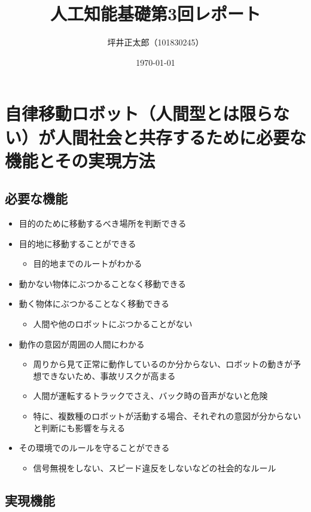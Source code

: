 \documentclass[a4paper,10pt]{jsarticle}
\begin{document}
\title{人工知能基礎第3回レポート}
\author{坪井正太郎（101830245）}
\date{\today}
\maketitle
\section{自律移動ロボット（人間型とは限らない）が人間社会と共存するために必要な機能とその実現方法}
\subsection{必要な機能}
\begin{itemize}
  \item 目的のために移動するべき場所を判断できる
  \item 目的地に移動することができる
        \begin{itemize}
          \item 目的地までのルートがわかる
        \end{itemize}
  \item 動かない物体にぶつかることなく移動できる
  \item 動く物体にぶつかることなく移動できる
        \begin{itemize}
          \item 人間や他のロボットにぶつかることがない
        \end{itemize}
  \item 動作の意図が周囲の人間にわかる
        \begin{itemize}
          \item 周りから見て正常に動作しているのか分からない、ロボットの動きが予想できないため、事故リスクが高まる
          \item 人間が運転するトラックでさえ、バック時の音声がないと危険
          \item 特に、複数種のロボットが活動する場合、それぞれの意図が分からないと判断にも影響を与える
        \end{itemize}
  \item その環境でのルールを守ることができる
        \begin{itemize}
          \item 信号無視をしない、スピード違反をしないなどの社会的なルール
        \end{itemize}
\end{itemize}

\subsection{実現機能}
\end{document}
